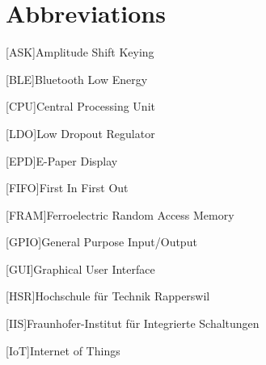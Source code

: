\chapter*{Abbreviations}
\begin{acronym}
	[ASK]{Amplitude Shift Keying}
\end{acronym}

\begin{acronym}
	[BLE]{Bluetooth Low Energy}
\end{acronym}

\begin{acronym}
	[CPU]{Central Processing Unit}
\end{acronym}

\begin{acronym}
	[LDO]{Low Dropout Regulator}
\end{acronym}

\begin{acronym}
	[EPD]{E-Paper Display}
\end{acronym}

\begin{acronym}
	[FIFO]{First In First Out}
\end{acronym}

\begin{acronym}
	[FRAM]{Ferroelectric Random Access Memory}
\end{acronym}

\begin{acronym}
	[GPIO]{General Purpose Input/Output}
\end{acronym}

\begin{acronym}
	[GUI]{Graphical User Interface}
\end{acronym}

\begin{acronym}
	[HSR]{Hochschule für Technik Rapperswil}
\end{acronym}

\begin{acronym}
	[IIS]{Fraunhofer-Institut für Integrierte Schaltungen}
\end{acronym}

\begin{acronym}
	[IoT]{Internet of Things}
\end{acronym}

